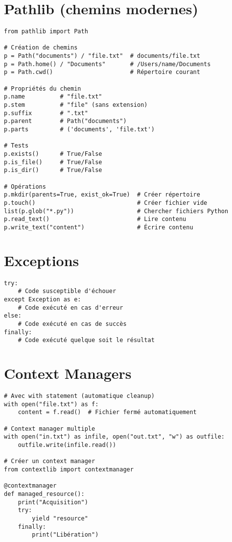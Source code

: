 \documentclass{article}
\begin{document}
\begin{multicols*}{4}
\section*{Pathlib (chemins modernes)}
\begin{lstlisting}
from pathlib import Path

# Création de chemins
p = Path("documents") / "file.txt"  # documents/file.txt
p = Path.home() / "Documents"       # /Users/name/Documents
p = Path.cwd()                      # Répertoire courant

# Propriétés du chemin
p.name          # "file.txt"
p.stem          # "file" (sans extension)
p.suffix        # ".txt"
p.parent        # Path("documents")
p.parts         # ('documents', 'file.txt')

# Tests
p.exists()      # True/False
p.is_file()     # True/False
p.is_dir()      # True/False

# Opérations
p.mkdir(parents=True, exist_ok=True)  # Créer répertoire
p.touch()                             # Créer fichier vide
list(p.glob("*.py"))                  # Chercher fichiers Python
p.read_text()                         # Lire contenu
p.write_text("content")               # Écrire contenu
\end{lstlisting}

\section*{Exceptions}
\begin{lstlisting}
try:
    # Code susceptible d'échouer
except Exception as e:
    # Code exécuté en cas d'erreur
else:
    # Code exécuté en cas de succès
finally:
    # Code exécuté quelque soit le résultat
\end{lstlisting}

\section*{Context Managers}
\begin{lstlisting}
# Avec with statement (automatique cleanup)
with open("file.txt") as f:
    content = f.read()  # Fichier fermé automatiquement

# Context manager multiple
with open("in.txt") as infile, open("out.txt", "w") as outfile:
    outfile.write(infile.read())

# Créer un context manager
from contextlib import contextmanager

@contextmanager
def managed_resource():
    print("Acquisition")
    try:
        yield "resource"
    finally:
        print("Libération")


\end{lstlisting}
\end{multicols*}
\end{document}
